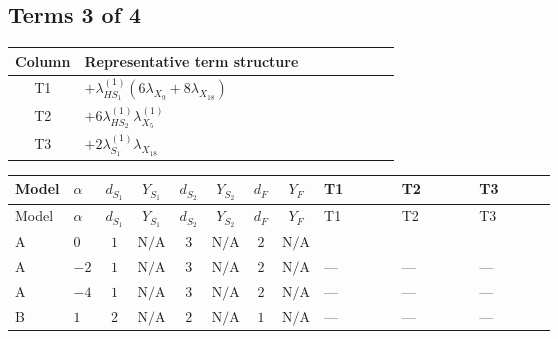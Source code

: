 \documentclass[8pt]{article}
\begin{document}
\begin{landscape}
\subsection*{Terms 3 of 4}
\begin{center}
\begin{tabular}{@{}c >{\raggedright\arraybackslash}p{0.82\linewidth}@{}}
\toprule
Column & Representative term structure \\
\midrule
T1 & \(\displaystyle +{\lambda_{HS_1}^{(1)}} (6 {\lambda_{X_{9}}}+8 {\lambda_{X_{18}}})\) \\
\midrule
T2 & \(\displaystyle +6 {\lambda_{HS_2}^{(1)}} {\lambda_{X_{5}}^{(1)}}\) \\
\midrule
T3 & \(\displaystyle +2 {\lambda_{S_1}^{(1)}} {\lambda_{X_{18}}}\) \\
\midrule
\bottomrule
\end{tabular}
\end{center}
\smallskip
\tiny
\begin{longtable}{@{}llcccccc >{\raggedright\arraybackslash}p{0.21\linewidth} >{\raggedright\arraybackslash}p{0.21\linewidth} >{\raggedright\arraybackslash}p{0.21\linewidth}@{}}
\toprule
Model & $\alpha$ & $d_{S_1}$ & $Y_{S_1}$ & $d_{S_2}$ & $Y_{S_2}$ & $d_F$ & $Y_F$ & T1 & T2 & T3 \\
\midrule
\endfirsthead
\toprule
Model & $\alpha$ & $d_{S_1}$ & $Y_{S_1}$ & $d_{S_2}$ & $Y_{S_2}$ & $d_F$ & $Y_F$ & T1 & T2 & T3 \\
\midrule
\endhead
A & $0$ & $1$ & $\text{N/A}$ & $3$ & $\text{N/A}$ & $2$ & $\text{N/A}$ & \scriptsize\adjustbox{max width=\linewidth}{$\begin{gathered} +{\lambda_{HS_1}^{(1)}} (6 {\lambda_{X_{9}}}+8 {\lambda_{X_{18}}})\end{gathered}$} & \scriptsize\adjustbox{max width=\linewidth}{$\begin{gathered} +6 {\lambda_{HS_2}^{(1)}} {\lambda_{X_{5}}^{(1)}}\end{gathered}$} & \scriptsize\adjustbox{max width=\linewidth}{$\begin{gathered} +2 {\lambda_{S_1}^{(1)}} {\lambda_{X_{18}}}\end{gathered}$} \\
\midrule
A & $-2$ & $1$ & $\text{N/A}$ & $3$ & $\text{N/A}$ & $2$ & $\text{N/A}$ & --- & --- & --- \\
\midrule
A & $-4$ & $1$ & $\text{N/A}$ & $3$ & $\text{N/A}$ & $2$ & $\text{N/A}$ & --- & --- & --- \\
\midrule
B & $1$ & $2$ & $\text{N/A}$ & $2$ & $\text{N/A}$ & $1$ & $\text{N/A}$ & --- & --- & --- \\

\end{longtable}
\end{landscape}
\end{document}
